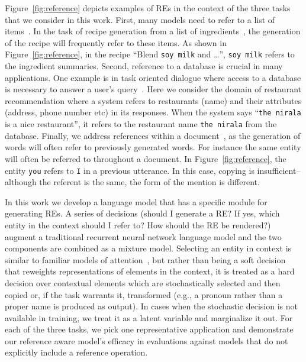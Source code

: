 \documentclass[11pt,letterpaper]{article}
\begin{document}
Figure~\ref{fig:reference} depicts examples of REs in the context of the three
tasks that we consider in this work.  First, many models need to refer to a list of
items~\citep{kiddon:2016, wen:2016}. In the task of recipe generation from a list of 
ingredients~\citep{kiddon:2016}, 
the generation of the recipe will frequently refer to these items. As shown in
Figure~\ref{fig:reference}, in the recipe ``Blend {\tt soy milk} and \ldots'',
{\tt soy milk} refers to the ingredient summaries. Second, reference to a database is crucial
in many applications. One example is in task oriented dialogue where access to
a database is necessary to answer a user's query~\citep{young2013pomdp,
  li:2016, vinyals:2015, wen:2016, sordoni:2015, serban2016building,
  bordes2016learning, williams2016end, shang2015neural, wen2016network}. Here
we consider the domain of restaurant recommendation where a system refers to
restaurants (name) and their attributes (address, phone number etc) in its
responses. When the system says ``{\tt the nirala} is a nice restaurant'', it
refers to the restaurant name {\tt the nirala} from the database. 
Finally, we address references within a document~\citep{mikolov2010recurrent, ji2015document,
  wang2015larger}, as the generation of words will often refer to previously
generated words.  For instance the same entity will often be referred to
throughout a document.  In Figure~\ref{fig:reference}, the entity {\tt you}
refers to {\tt I} in a previous utterance. In this case, copying is 
insufficient-- although the referent is the same, the form of the mention is different.

In this work we develop a language model that has a specific module for
generating REs. A series of decisions (should I generate a RE? If yes, which
entity in the context should I refer to? How should the RE be rendered?)
augment a traditional recurrent neural network language model and the two
components are combined as a mixture model. Selecting an entity in context is
similar to familiar models of
attention~\citep{BahdanauCB14}, but rather than being a soft
decision that reweights representations of elements in the context, it is
treated as a hard decision over contextual elements which are stochastically
selected and then copied or, if the task warrants it, transformed (e.g., a
pronoun rather than a proper name is produced as output).
In cases when the stochastic decision is not available in training, we treat it
as a latent variable and marginalize it out. For each of the three tasks, we
pick one representative application and demonstrate our reference aware model's
efficacy in evaluations against models that do not explicitly include a
reference operation.
\end{document}
